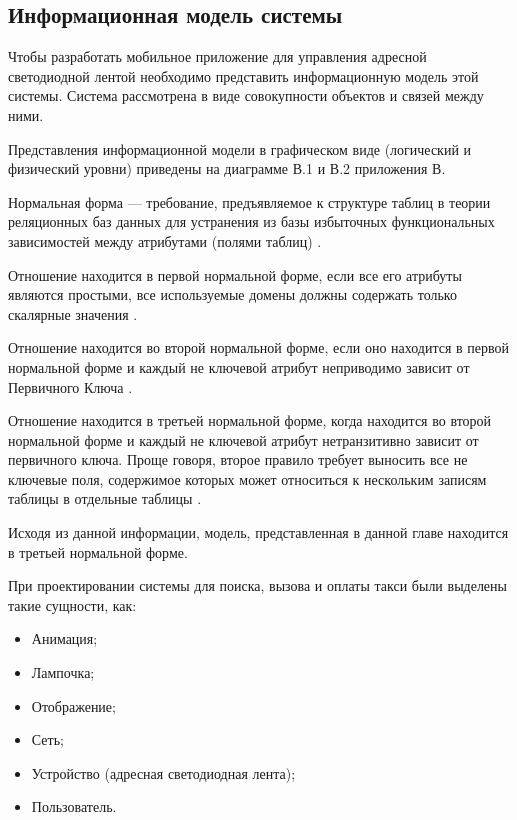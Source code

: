 \subsection{Информационная модель системы}
\label{sec:develop:umlDiagrams}

Чтобы разработать мобильное приложение для управления адресной светодиодной лентой необходимо представить информационную модель этой системы. Система рассмотрена в виде совокупности объектов и связей между ними. 

Представления информационной модели в графическом виде (логический и физический уровни) приведены на диаграмме В.1 и В.2 приложения В.

Нормальная форма — требование, предъявляемое к структуре таблиц в теории реляционных баз данных для устранения из базы избыточных функциональных зависимостей между атрибутами (полями таблиц) \cite{er_info}.

Отношение находится в первой нормальной форме, если все его атрибуты являются простыми, все используемые домены должны содержать только скалярные значения \cite{er_info}.

Отношение находится во второй нормальной форме, если оно находится в первой нормальной форме и каждый не ключевой атрибут неприводимо зависит от Первичного Ключа \cite{er_info}.

Отношение находится в третьей нормальной форме, когда находится во второй нормальной форме и каждый не ключевой атрибут нетранзитивно зависит от первичного ключа. Проще говоря, второе правило требует выносить все не ключевые поля, содержимое которых может относиться к нескольким записям таблицы в отдельные таблицы \cite{er_info}.

Исходя из данной информации, модель, представленная в данной главе находится в третьей нормальной форме.

При проектировании системы для поиска, вызова и оплаты такси были выделены такие сущности, как:
\begin{itemize}
	\item Анимация;
	\item Лампочка;
	\item Отображение;
	\item Сеть;
	\item Устройство (адресная светодиодная лента);
	\item Пользователь.
\end{itemize}

